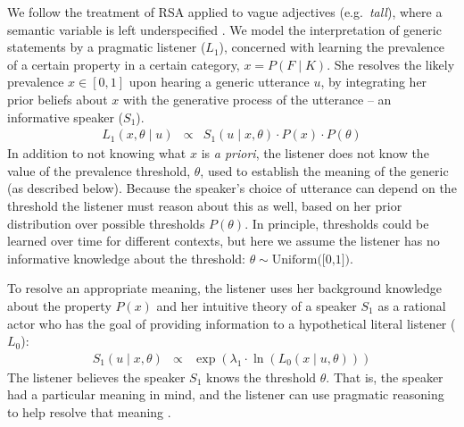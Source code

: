 \documentclass[12pt,letterpaper]{article}
\begin{document}
We follow the treatment of RSA applied to vague adjectives (e.g.~\emph{tall}), where a semantic variable is left underspecified \cite{Lassiter2013,Lassiter2015}.
We model the interpretation of generic statements by a pragmatic listener ($L_1$), concerned with learning the prevalence of a certain property in a certain category, $x=P(F \mid K)$.
She resolves the likely prevalence $x \in [0, 1]$ upon hearing a generic utterance $u$, by integrating her prior beliefs about $x$ with the generative process of the utterance -- an informative speaker ($S_1$).
%
\begin{eqnarray}
L_{1}(x , \theta \mid u) &\propto& S_{1}(u \mid x, \theta) \cdot P(x) \cdot P(\theta) \label{eq:L1}
\end{eqnarray}
%
In addition to not knowing what $x$ is \emph{a priori}, the listener does not know the value of the prevalence threshold, $\theta$, used to establish the meaning of the generic (as described below). Because the speaker's choice of utterance can depend on the  threshold the listener must reason about this as well, based on her prior distribution over possible thresholds $P(\theta)$.
In principle, thresholds could be learned over time for different contexts, but here we assume the listener has no informative knowledge about the threshold: $\theta \sim \text{Uniform([0,1])}$.

To resolve an appropriate meaning, the listener uses her background knowledge about the property $P(x)$ and her intuitive theory of a speaker $S_1$ as a rational actor who has the goal of providing information to a hypothetical literal listener ($L_0$):
\begin{eqnarray}
S_{1}(u \mid x, \theta) &\propto& \exp{(\lambda_1 \cdot \ln  ( {L_{0}(x \mid u, \theta)} ) ) }\label{eq:S1}
\end{eqnarray}
%
The listener believes the speaker $S_1$ knows the threshold $\theta$.
That is, the speaker had a particular meaning in mind, and the listener can use pragmatic reasoning to help resolve that meaning \cite{Lassiter2013, Lassiter2015, GoodmanLassiter}. 
\end{document}
